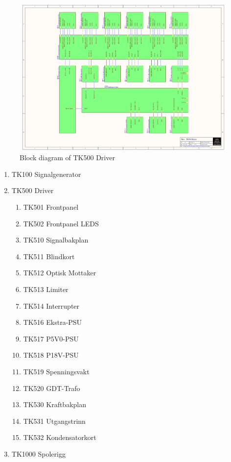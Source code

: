 \begin{figure}
    \centering
    \includegraphics[trim={5cm 2cm 5cm 1cm},clip,width=\textwidth]{img/TK500_Driver.pdf}
    \caption{Block diagram of TK500 Driver}
    \label{fig:tk500}
\end{figure}

\begin{enumerate}
    \item TK100 Signalgenerator
    \item TK500 Driver
    \begin{enumerate}
        \item TK501 Frontpanel
        \item TK502 Frontpanel LEDS
        \item TK510 Signalbakplan
        \item TK511 Blindkort
        \item TK512 Optisk Mottaker
        \item TK513 Limiter
        \item TK514 Interrupter
        \item TK516 Ekstra-PSU
        \item TK517 P5V0-PSU
        \item TK518 P18V-PSU
        \item TK519 Spenningsvakt
        \item TK520 GDT-Trafo
        \item TK530 Kraftbakplan
        \item TK531 Utgangstrinn
        \item TK532 Kondensatorkort
    \end{enumerate}
    \item TK1000 Spolerigg
\end{enumerate}

